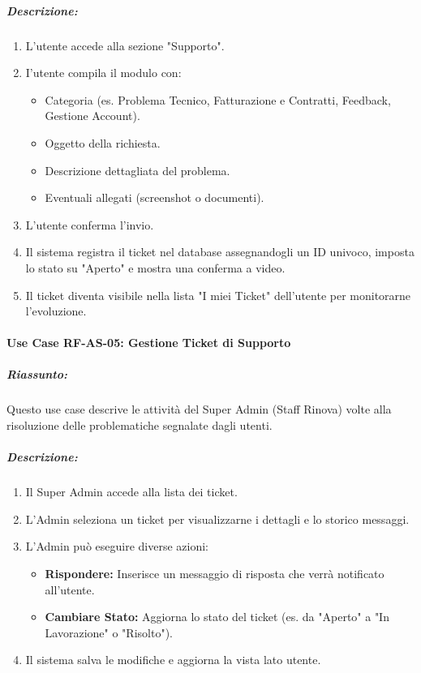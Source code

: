 \subparagraph*{Descrizione:}
\begin{enumerate}
    \item L’utente accede alla sezione "Supporto".
    \item I'utente compila il modulo con:
    \begin{itemize}
        \item Categoria (es. Problema Tecnico, Fatturazione e Contratti, Feedback, Gestione Account).
        \item Oggetto della richiesta.
        \item Descrizione dettagliata del problema.
        \item Eventuali allegati (screenshot o documenti).
    \end{itemize}
    \item L'utente conferma l'invio.
    \item Il sistema registra il ticket nel database assegnandogli un ID univoco, imposta lo stato su "Aperto" e mostra una conferma a video.
    \item Il ticket diventa visibile nella lista "I miei Ticket" dell'utente per monitorarne l'evoluzione.
\end{enumerate}

\paragraph*{Use Case RF-AS-05: Gestione Ticket di Supporto}
\subparagraph*{Riassunto:}
Questo use case descrive le attività del Super Admin (Staff Rinova) volte alla risoluzione delle problematiche segnalate dagli utenti.

\subparagraph*{Descrizione:}
\begin{enumerate}
    \item Il Super Admin accede alla lista dei ticket.
    \item L'Admin seleziona un ticket per visualizzarne i dettagli e lo storico messaggi.
    \item L'Admin può eseguire diverse azioni:
    \begin{itemize}
        \item \textbf{Rispondere:} Inserisce un messaggio di risposta che verrà notificato all'utente.
        \item \textbf{Cambiare Stato:} Aggiorna lo stato del ticket (es. da "Aperto" a "In Lavorazione" o "Risolto").
    \end{itemize}
    \item Il sistema salva le modifiche e aggiorna la vista lato utente.
\end{enumerate}